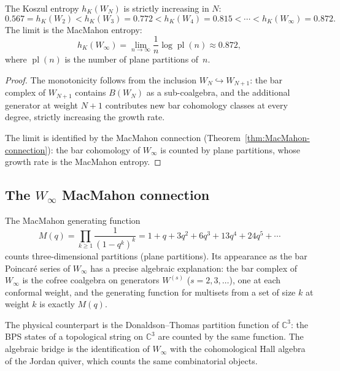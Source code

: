 \begin{theorem}
The Koszul entropy $h_K(W_N)$ is strictly increasing in $N$:
\[
0.567 = h_K(W_2)
< h_K(W_3) = 0.772
< h_K(W_4) = 0.815
< \cdots
< h_K(W_\infty) = 0.872.
\]
The limit is the MacMahon entropy:
\begin{equation}%
h_K(W_\infty)
=
\lim_{n \to \infty} \frac{1}{n}\log\operatorname{pl}(n)
\approx 0.872,
\end{equation}
where $\operatorname{pl}(n)$ is the number of plane partitions of~$n$.
\end{theorem}

\begin{proof}
The monotonicity follows from the inclusion
$W_N \hookrightarrow W_{N+1}$: the bar complex of $W_{N+1}$ contains
$B(W_N)$ as a sub-coalgebra, and the additional generator at weight
$N+1$ contributes new bar cohomology classes at every degree, strictly
increasing the growth rate.

The limit is identified by the MacMahon connection
(Theorem~\ref{thm:MacMahon-connection}): the bar cohomology of $W_\infty$
is counted by plane partitions, whose growth rate is the MacMahon entropy.
\end{proof}

\subsection{The $W_\infty$ MacMahon connection}

\begin{remark}
The MacMahon generating function
\[
M(q) = \prod_{k \ge 1} \frac{1}{(1-q^k)^k}
= 1 + q + 3q^2 + 6q^3 + 13q^4 + 24q^5 + \cdots
\]
counts three-dimensional partitions (plane partitions). Its appearance
as the bar Poincar\'e series of $W_\infty$ has a precise algebraic
explanation: the bar complex of $W_\infty$ is the cofree coalgebra on
generators $W^{(s)}$ ($s = 2,3,\dots$), one at each conformal weight,
and the generating function for multisets from a set of size $k$ at
weight $k$ is exactly $M(q)$.

The physical counterpart is the Donaldson--Thomas partition function of
$\mathbb{C}^3$: the BPS states of a topological string on $\mathbb{C}^3$
are counted by the same function. The algebraic bridge is the identification
of $W_\infty$ with the cohomological Hall algebra of the Jordan quiver,
which counts the same combinatorial objects.
\end{remark}

